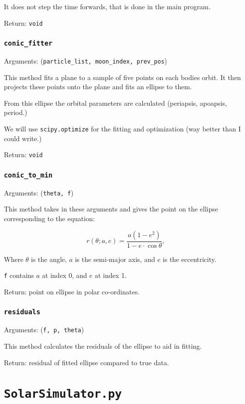 \documentclass[a4paper, 11pt, british, left=1in, right=1in, top=0.3in, bottom=1in]{article}
\begin{document}
	It does not step the time forwards, that is done in the main program.
	
	Return: \texttt{void}
	
	\subsubsection{\texttt{conic\_fitter}}
	
	Arguments: (\texttt{particle\_list, moon\_index, prev\_pos})
	
	This method fits a plane to a sample of  five points on each bodies orbit. It then projects these points onto the plane and fits an ellipse to them. 
	
	From this ellipse the orbital parameters are calculated (periapsis, apoapsis, period.)
	
	We will use \texttt{scipy.optimize} for the fitting and optimization (way better than I could write.)
	
	Return: \texttt{void}
	
	
	\subsubsection{\texttt{conic\_to\_min}}
	Arguments: (\texttt{theta, f})
	
	This method takes in these arguments and gives the point on the ellipse corresponding to the equation: 
	
	
	$$r(\theta;a, e) = \frac{a(1-e^2)}{1-e\cdot\cos\theta},$$
	
	Where $\theta$ is the angle, $a$ is the semi-major axis, and $e$ is the eccentricity.
	
	\texttt{f} contains $a$ at index 0, and $e$ at index 1.
	
	Return: point on ellipse in polar co-ordinates. 
	
	\subsubsection{\texttt{residuals}}
	
	Arguments: (\texttt{f, p, theta})
	
	This method calculates the residuals of the ellipse to aid in fitting. 
	
	Return: residual of fitted ellipse compared to true data.
	
	\section{\texttt{SolarSimulator.py}}
	
\end{document}
